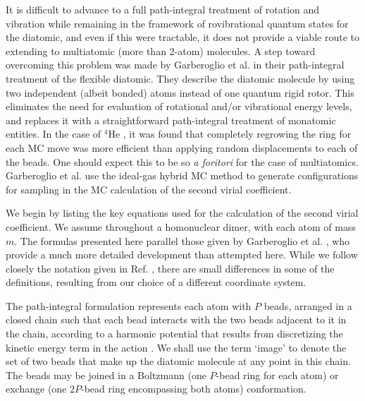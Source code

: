         It is difficult to advance to a full path-integral treatment of rotation and vibration while remaining in the framework of rovibrational quantum states for the diatomic, and even if this were tractable, it does not provide a viable route to extending to multiatomic (more than 2-atom) molecules. A step toward overcoming this problem was made by Garberoglio et al. \cite{Garberoglio2014} in their path-integral treatment of the flexible diatomic. They describe the diatomic molecule by using two independent (albeit bonded) atoms instead of one quantum rigid rotor. This eliminates the need for evaluation of rotational and/or vibrational energy levels, and replaces it with a straightforward path-integral treatment of monatomic entities. In the case of $^4$He \cite{Shaul2012}, it was found that completely regrowing the ring for each MC move was more efficient than applying random displacements to each of the beads. One should expect this to be so \emph{a foritori} for the case of multiatomics. Garberoglio et al. \cite{Garberoglio2014} use the ideal-gas hybrid MC method to generate configurations for sampling in the MC calculation of the second virial coefficient.
        
        We begin by listing the key equations used for the calculation of the second virial coefficient. We assume throughout a homonuclear dimer, with each atom of mass $m$. The formulas presented here parallel those given by Garberoglio et al. \cite{Garberoglio2014}, who provide a much more detailed development than attempted here. While we follow closely the notation given in Ref. \cite{Garberoglio2014}, there are small differences in some of the definitions, resulting from our choice of a different coordinate system.

        The path-integral formulation represents each atom with $P$ beads, arranged in a closed chain such that each bead interacts with the two beads adjacent to it in the chain, according to a harmonic potential that results from discretizing the kinetic energy term in the action \cite{Feynman}. We shall use the term `image' to denote the set of two beads that make up the diatomic molecule at any point in this chain. The beads may be joined in a Boltzmann (one $P$-bead ring for each atom) or exchange (one $2P$-bead ring encompassing both atoms) conformation.

